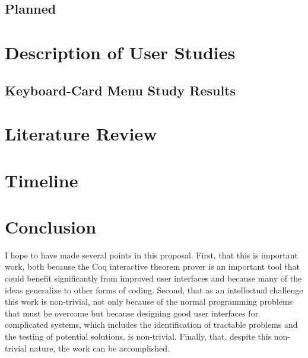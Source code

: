 \documentclass[11pt]{amsart}
\begin{document}
\subsection{Planned}


\section{Description of User Studies}


\subsection{Keyboard-Card Menu Study Results}

\section{Literature Review}



\section{Timeline}



\section{Conclusion}

I hope to have made several points in this proposal.  First, that this is important work, both because the Coq interactive theorem prover is an important tool that could benefit significantly from improved user interfaces and because many of the ideas generalize to other forms of coding.  Second, that as an intellectual challenge this work is non-trivial, not only because of the normal programming problems that must be overcome but because designing good user interfaces for complicated systems, which includes the identification of tractable problems and the testing of potential solutions, is non-trivial.  Finally, that, despite this non-trivial nature, the work can be accomplished.




\end{document}

